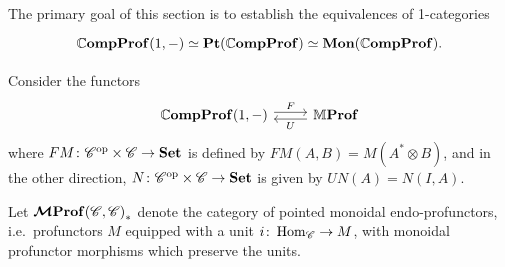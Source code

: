 \documentclass[12pt,oneside,article,draft]{memoir}
\begin{document}
The primary goal of this section is to establish the equivalences of 1-categories
\begin{equation}
   \begin{tikzcd}
      \dCompProf(1,-) \equiv \Pt(\dCompProf) \equiv \Mon(\dCompProf).
   \end{tikzcd}
\end{equation}

Consider the functors
\begin{equation}\label{eqn:functors 1C CC}
\begin{tikzcd}
   \dCompProf(1,-) \ar[r,shift left,"F"]
   & \dMProf \ar[l,shift left,"U"]
\end{tikzcd}
\end{equation}
where $FM\colon{\mathscr{C}}^{\text{op}}\times\mathscr{C}\to\mathbf{Set}$ is defined by $FM(A,B)=M(A^*\otimes B)$, and in the other direction, $N\colon{\mathscr{C}}^{\text{op}}\times\mathscr{C}\to\mathbf{Set}$ is given by $UN(A)=N(I,A)$.

Let $\bm{\mathcal{M}}\mathbf{Prof}{(\mathscr{C},\mathscr{C})}_{\ast}$ denote the category of pointed monoidal endo-profunctors, i.e.~profunctors $M$ equipped with a unit $i\colon\operatorname{Hom}_{\mathscr{C}}\to M$, with monoidal profunctor morphisms which preserve the units.
\end{document}
